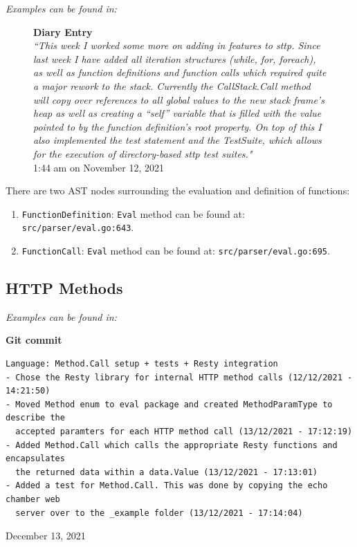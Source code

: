 \documentclass[]{full}
\theoremstyle{definition}
\begin{document}
\textit{Examples can be found in: }

\begin{figure}[H]
    \begin{center}
        \textbf{Diary Entry}\\[0.5em]
        \textit{``This week I worked some more on adding in features to sttp. Since last week I have added all iteration structures (while, for, foreach), as well as function definitions and function calls which required quite a major rework to the stack. Currently the CallStack.Call method will copy over references to all global values to the new stack frame’s heap as well as creating a “self” variable that is filled with the value pointed to by the function definition’s root property. On top of this I also implemented the test statement and the TestSuite, which allows for the execution of directory-based sttp test suites."}\\[0.5em]
        \tiny{1:44 am on November 12, 2021}
    \end{center}
\end{figure}

There are two AST nodes surrounding the evaluation and definition of functions:

\begin{enumerate}
    \item \verb|FunctionDefinition|: \verb|Eval| method can be found at: \verb|src/parser/eval.go:643|.
    \item \verb|FunctionCall|: \verb|Eval| method can be found at: \verb|src/parser/eval.go:695|.
\end{enumerate}

\subsection{HTTP Methods}

\textit{Examples can be found in: }

\begin{center}
    \textbf{Git commit}
    \begin{verbatim}
Language: Method.Call setup + tests + Resty integration
- Chose the Resty library for internal HTTP method calls (12/12/2021 - 14:21:50)
- Moved Method enum to eval package and created MethodParamType to describe the
  accepted paramters for each HTTP method call (13/12/2021 - 17:12:19)
- Added Method.Call which calls the appropriate Resty functions and encapsulates
  the returned data within a data.Value (13/12/2021 - 17:13:01)
- Added a test for Method.Call. This was done by copying the echo chamber web
  server over to the _example folder (13/12/2021 - 17:14:04)
    \end{verbatim}
    \vspace{-1em}
    \tiny{December 13, 2021}
\end{center}
\end{document}
